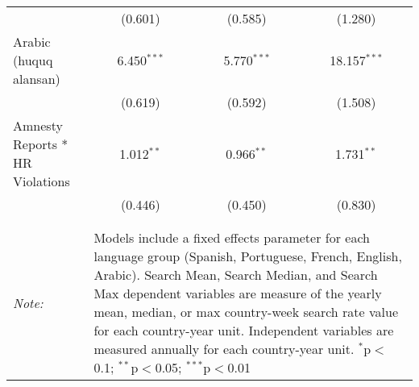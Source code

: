 \begin{table}[!htbp]
\begin{tabular}{@{\extracolsep{5pt}}lccc}
  & (0.601) & (0.585) & (1.280) \\ 
  Arabic (huquq alansan) & 6.450$^{***}$ & 5.770$^{***}$ & 18.157$^{***}$ \\ 
  & (0.619) & (0.592) & (1.508) \\ 
  Amnesty Reports * HR Violations & 1.012$^{**}$ & 0.966$^{**}$ & 1.731$^{**}$ \\ 
  & (0.446) & (0.450) & (0.830) \\ 
 \hline \\[-1.8ex] 
\hline 
\hline \\[-1.8ex] 
\textit{Note:}  & \multicolumn{3}{l}{\parbox[t]{8cm}{Models include a fixed effects parameter for each language group (Spanish, Portuguese, French, English, Arabic). Search Mean, Search Median, and Search Max dependent variables are measure of the yearly mean, median, or max country-week search rate value for each country-year unit. Independent variables are measured annually for each country-year unit. $^{*}$p$<$0.1; $^{**}$p$<$0.05; $^{***}$p$<$0.01}} \\ 
\end{tabular} 
\end{table} 

